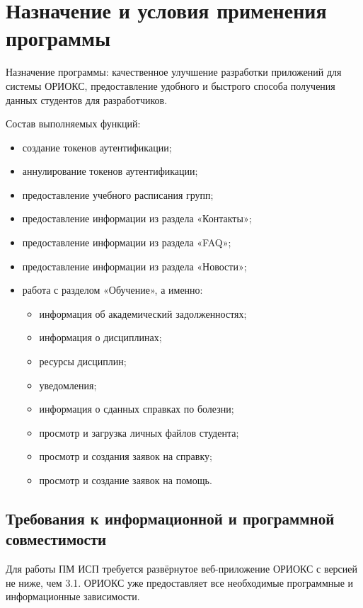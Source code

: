 \chapter{Назначение и условия применения программы}
\label{ch:function}

Назначение программы: качественное улучшение разработки приложений для системы ОРИОКС, предоставление удобного и
быстрого способа получения данных студентов для разработчиков.

Состав выполняемых функций:
\begin{itemize}
  \item создание токенов аутентификации;
  \item аннулирование токенов аутентификации;
  \item предоставление учебного расписания групп;
  \item предоставление информации из раздела «Контакты»;
  \item предоставление информации из раздела «FAQ»;
  \item предоставление информации из раздела «Новости»;
  \item работа с разделом «Обучение», а именно:
  \begin{itemize}
    \item информация об академический задолженностях;
    \item информация о дисциплинах;
    \item ресурсы дисциплин;
    \item уведомления;
    \item информация о сданных справках по болезни;
    \item просмотр и загрузка личных файлов студента;
    \item просмотр и создания заявок на справку;
    \item просмотр и создание заявок на помощь.
  \end{itemize}
\end{itemize}

\section{Требования к информационной и программной совместимости}
\label{sec:techReqmts}

Для работы ПМ ИСП требуется развёрнутое веб-приложение ОРИОКС с версией не
ниже, чем 3.1.
ОРИОКС уже предоставляет все необходимые программные и информационные зависимости.
